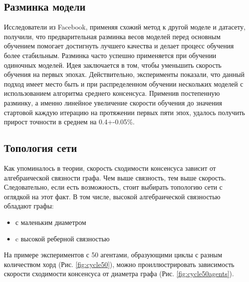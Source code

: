 \documentclass[a4paper,article,14pt]{extarticle}
\begin{document}
\subsection{Разминка модели}
Исследователи из Facebook, применяя \cite{012} схожий метод к другой моделе и датасету, получили, что предварительная разминка весов моделей перед основным обучением помогает достигнуть лучшего качества и делает процесс обучения более стабильным. Разминка часто успешно применяется при обучении одиночных моделей. Идея заключается в том, чтобы уменьшить скорость обучения на первых эпохах. Действительно, эксперименты показали, что данный подход имеет место быть и при распределенном обучении нескольких моделей с использованием алгоритма среднего консенсуса. Применив постепенную разминку, а именно линейное увеличение скорости обучения до значения стартовой каждую итерацию на протяжении первых пяти эпох, удалось получить прирост точности в среднем на 0.4+-0.05\%.

\subsection{Топология сети}
Как упоминалось в теории, скорость сходимости консенсуса зависит от алгебраической связности графа. Чем выше связность, тем выше скорость. Следовательно, если есть возможность, стоит выбирать топологию сети с оглядкой на этот факт. В том числе, высокой алгебраической связностью обладают графы:
\begin{itemize}
    \item с маленьким диаметром
    \item c высокой реберной связностью
\end{itemize}

На примере экспериментов с 50 агентами, образующими циклы с разным количеством хорд (Рис. \ref{fig:cycle50}), можно проиллюстрировать зависимость скорости сходимости консенсуса от диаметра графа (Рис. \ref{fig:cycle50agents}).
\end{document}
